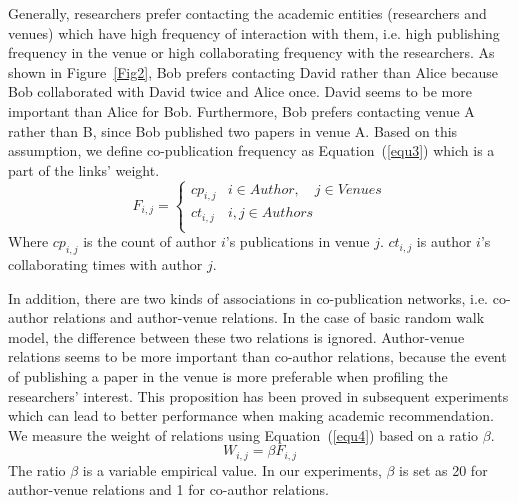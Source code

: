 \documentclass[9pt]{acm_proc_article-sp}
\begin{document}
Generally, researchers prefer contacting the academic entities (researchers and venues) which have high frequency of interaction with them, i.e. high publishing frequency in the venue or high collaborating frequency with the researchers. As shown in Figure~\ref{Fig2}, Bob prefers contacting David rather than Alice because Bob collaborated with David twice and Alice once. David seems to be more important than Alice for Bob. Furthermore, Bob prefers contacting venue A rather than B, since Bob published two papers in venue A. Based on this assumption, we define co-publication frequency as Equation~(\ref{equ3}) which is a part of the links' weight.
\begin{equation}
\label{equ3}
F_{i,j}=\left\{\begin{array}{ll}
cp_{i,j} & i\in Author,\quad j\in Venues\\
ct_{i,j} & i,j\in Authors\\
\end{array}\right.
\end{equation}
Where $cp_{i,j}$ is the count of author $i$'s publications in venue $j$. $ct_{i,j}$ is author $i$'s collaborating times with author $j$.

In addition, there are two kinds of associations in co-publication networks, i.e. co-author relations and author-venue relations. In the case of basic random walk model, the difference between these two relations is ignored. Author-venue relations seems to be more important than co-author relations, because the event of publishing a paper in the venue is more preferable when profiling the researchers' interest. This proposition has been proved in subsequent experiments which can lead to better performance when making academic recommendation. We measure the weight of relations using Equation~(\ref{equ4}) based on a ratio $\beta$.
\begin{equation}
\label{equ4}
W_{i,j}=\beta F_{i,j}
\end{equation}
The ratio $\beta$ is a variable empirical value. In our experiments, $\beta$ is set as 20 for author-venue relations and 1 for co-author relations.
\end{document}
